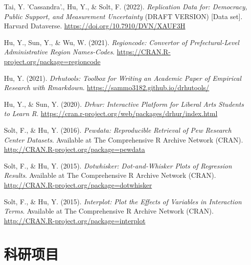 \documentclass[11pt,a4paper,]{awesome-cv}
\begin{document}
\hypertarget{bibliography}{}
\leavevmode{}%
Tai, Y. 'Cassandra'., Hu, Y., \& Solt, F. (2022). \emph{Replication Data
for: Democracy, Public Support, and Measurement Uncertainty} (DRAFT
VERSION) {[}Data set{]}. Harvard Dataverse.
\url{https://doi.org/10.7910/DVN/XAUF3H}

\leavevmode{}%
Hu, Y., Sun, Y., \& Wu, W. (2021). \emph{Regioncode: Convertor of
Prefectural-Level Administrative Region Names-Codes}.
\url{https://CRAN.R-project.org/package=regioncode}

\leavevmode{}%
Hu, Y. (2021). \emph{Drhutools: Toolbox for Writing an Academic Paper of
Empirical Research with Rmarkdown}.
\url{https://sammo3182.github.io/drhutools/}

\leavevmode{}%
Hu, Y., \& Sun, Y. (2020). \emph{Drhur: Interactive Platform for Liberal
Arts Students to Learn R}.
\url{https://cran.r-project.org/web/packages/drhur/index.html}

\leavevmode{}%
Solt, F., \& Hu, Y. (2016). \emph{Pewdata: Reproducible Retrieval of Pew
Research Center Datasets}. Available at The Comprehensive R Archive
Network (CRAN). \url{http://CRAN.R-project.org/package=pewdata}

\leavevmode{}%
Solt, F., \& Hu, Y. (2015). \emph{Dotwhisker: Dot-and-Whisker Plots of
Regression Results}. Available at The Comprehensive R Archive Network
(CRAN). \url{http://CRAN.R-project.org/package=dotwhisker}

\leavevmode{}%
Solt, F., \& Hu, Y. (2015). \emph{Interplot: Plot the Effects of
Variables in Interaction Terms}. Available at The Comprehensive R
Archive Network (CRAN).
\url{http://CRAN.R-project.org/package=interplot}

\endgroup

\hypertarget{ux79d1ux7814ux9879ux76ee}{%
\section{科研项目}\label{ux79d1ux7814ux9879ux76ee}}

\begin{cventries}
    \vspace{-4.0mm}
    \vspace{-4.0mm}
    \vspace{-4.0mm}
    \vspace{-4.0mm}
\end{cventries}
\end{document}
